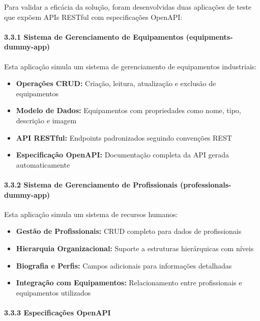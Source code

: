 \documentclass[
]{article}
\providecommand{\tightlist}{%
  \setlength{\itemsep}{0pt}\setlength{\parskip}{0pt}}
\begin{document}
Para validar a eficácia da solução, foram desenvolvidas duas aplicações
de teste que expõem APIs RESTful com especificações OpenAPI:

\paragraph{3.3.1 Sistema de Gerenciamento de Equipamentos
(equipments-dummy-app)}\label{sistema-de-gerenciamento-de-equipamentos-equipments-dummy-app}

Esta aplicação simula um sistema de gerenciamento de equipamentos
industriais:

\begin{itemize}
\tightlist
\item
  \textbf{Operações CRUD:} Criação, leitura, atualização e exclusão de
  equipamentos
\item
  \textbf{Modelo de Dados:} Equipamentos com propriedades como nome,
  tipo, descrição e imagem
\item
  \textbf{API RESTful:} Endpoints padronizados seguindo convenções REST
\item
  \textbf{Especificação OpenAPI:} Documentação completa da API gerada
  automaticamente
\end{itemize}

\paragraph{3.3.2 Sistema de Gerenciamento de Profissionais
(professionals-dummy-app)}\label{sistema-de-gerenciamento-de-profissionais-professionals-dummy-app}

Esta aplicação simula um sistema de recursos humanos:

\begin{itemize}
\tightlist
\item
  \textbf{Gestão de Profissionais:} CRUD completo para dados de
  profissionais
\item
  \textbf{Hierarquia Organizacional:} Suporte a estruturas hierárquicas
  com níveis
\item
  \textbf{Biografia e Perfis:} Campos adicionais para informações
  detalhadas
\item
  \textbf{Integração com Equipamentos:} Relacionamento entre
  profissionais e equipamentos utilizados
\end{itemize}

\paragraph{3.3.3 Especificações
OpenAPI}\label{especificauxe7uxf5es-openapi}
\end{document}
